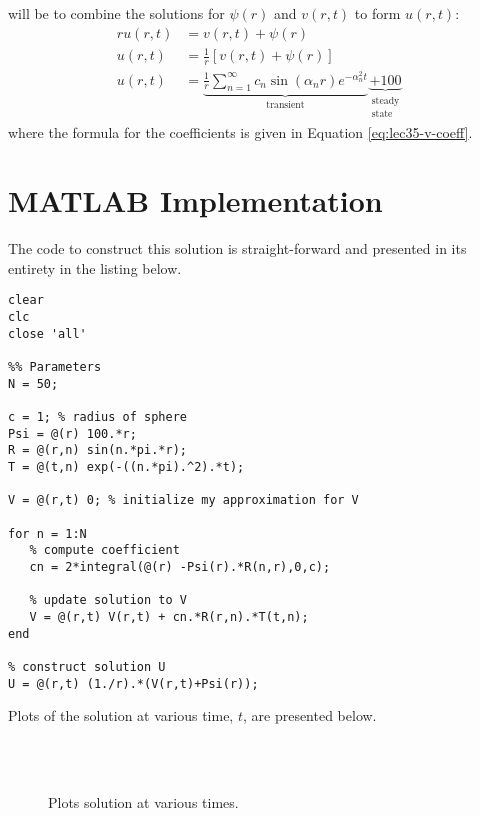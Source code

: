  will be to combine the solutions for $\psi(r)$ and $v(r,t)$ to form $u(r,t)$:
\begin{align*}
ru(r,t) &= v(r,t) + \psi(r) \\
u(r,t) &= \frac{1}{r}\left[ v(r,t) + \psi(r)\right] \\
u(r,t) &= \underbrace{\frac{1}{r}\sum\limits_{n=1}^{\infty}c_n \sin{(\alpha_n r)}e^{-\alpha_n^2 t}}_{\text{transient}} \underbrace{+ 100}_{\substack{\text{steady}\\ \text{state}}} 
\end{align*}
where the formula for the coefficients is given in Equation \ref{eq:lec35-v-coeff}.

\section{MATLAB Implementation}

The code to construct this solution is straight-forward and presented in its entirety in the listing below.

\begin{lstlisting}[name=lec35-ex, style=myMatlab]
clear
clc
close 'all'

%% Parameters
N = 50;

c = 1; % radius of sphere
Psi = @(r) 100.*r;
R = @(r,n) sin(n.*pi.*r);
T = @(t,n) exp(-((n.*pi).^2).*t);

V = @(r,t) 0; % initialize my approximation for V

for n = 1:N
   % compute coefficient
   cn = 2*integral(@(r) -Psi(r).*R(n,r),0,c);
   
   % update solution to V
   V = @(r,t) V(r,t) + cn.*R(r,n).*T(t,n);
end

% construct solution U
U = @(r,t) (1./r).*(V(r,t)+Psi(r));
\end{lstlisting}
Plots of the solution at various time, $t$, are presented below.

\begin{figure}[h!]
 \\
 \\
\label{fig:lec35-ex-plots}
\caption{Plots solution at various times.}
\end{figure}

